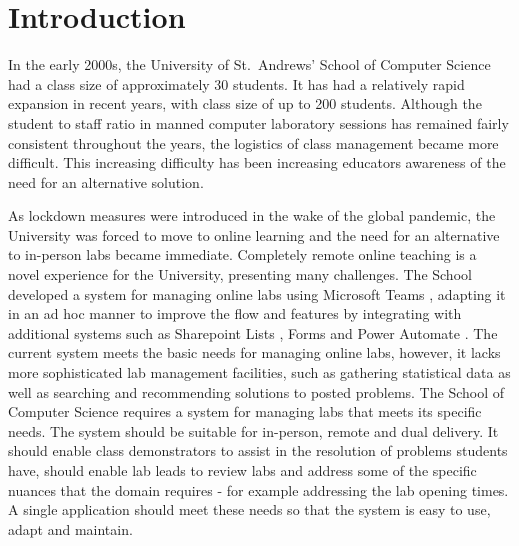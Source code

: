 \chapter{Introduction}


In the early 2000s, the University of St.\ Andrews' School of Computer Science had a class size of approximately 30 students. It has had a relatively rapid expansion in recent years, with class size of up to 200 students. Although the student to staff ratio in manned computer laboratory sessions has remained fairly consistent throughout the years, the logistics of class management became more difficult. This increasing difficulty has been increasing educators awareness of the need for an alternative solution.

As lockdown measures were introduced in the wake of the global pandemic, the University was forced to move to online learning and the need for an alternative to in-person labs became immediate. Completely remote online teaching is a novel experience for the University, presenting many challenges. The School developed a system for managing online labs using Microsoft Teams \cite{teams}, adapting it in an ad hoc manner to improve the flow and features by integrating with additional systems such as Sharepoint Lists \cite{lists}, Forms \cite{forms} and Power Automate \cite{pauto}. The current system meets the basic needs for managing online labs, however, it lacks more sophisticated lab management facilities, such as gathering statistical data as well as searching and recommending solutions to posted problems.   
The School of Computer Science requires a system for managing labs that meets its specific needs. The system should be suitable for in-person, remote and dual delivery. It should enable class demonstrators to assist in the resolution of problems students have, should enable lab leads to review labs and address some of the specific nuances that the domain requires - for example addressing the lab opening times. A single application should meet these needs so that the system is easy to use, adapt and maintain.

